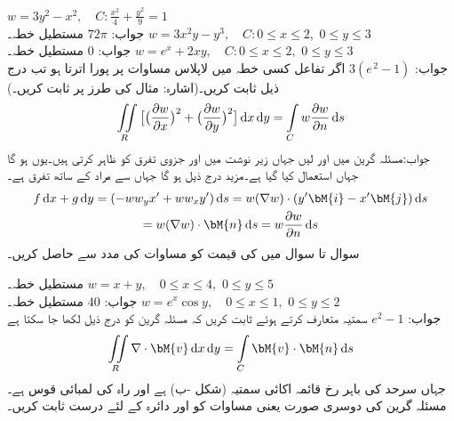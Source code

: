  \quad
$w=3y^2-x^2,\quad C:\tfrac{x^2}{4}+\tfrac{y^2}{9}=1$\\
جواب:\quad
$72\pi$
 \quad مستطیل خطہ۔\quad
$w=3x^2y-y^3,\quad C:0\le x\le 2,\,\, 0\le y\le 3$\\
جواب:\quad
$0$
 \quad مستطیل خطہ۔\quad
$w=e^x+2xy,\quad C:0\le x\le 2,\,\, 0\le y\le 3$\\
جواب:\quad
$3(e^{\,2}-1)$
\quad اگر تفاعل  کسی خطہ  میں لاپلاس مساوات  پر پورا اترتا ہو تب درج ذیل ثابت کریں۔(اشارہ: مثال  کی طرز پر ثابت کریں۔) 
\begin{align}\label{مساوات_خطی_تکمل_لاپلاسی_تعلق_ب}
\iint\limits_R \big[\big(\frac{\partial w}{\partial x}\big)^2+\big(\frac{\partial w}{\partial y}\big)^2\big]\dif x\dif y=\int\limits_C w\frac{\partial w}{\partial n}\dif s
\end{align}
جواب:مسئلہ گرین میں  اور  لیں جہاں زیر نوشت میں  اور  جزوی تفرق کو ظاہر کرتی ہیں۔یوں 
 ہو گا جہاں  استعمال کیا گیا ہے۔مزید درج ذیل ہو گا جہاں  سے مراد  کے ساتھ تفرق ہے۔
\begin{multline*}
f\dif x+g\dif y=(-ww_yx'+ww_xy')\dif s=w(\nabla w)\cdot (y'\bM{i}-x'\bM{j})\dif s\\
=w(\nabla w)\cdot \bM{n}\dif s=w\frac{\partial w}{\partial n}\dif s
\end{multline*}
سوال  تا سوال  میں  کی قیمت کو مساوات  کی مدد سے حاصل کریں۔

\quad مستطیل خطہ۔
$w=x+y,\quad 0\le x\le 4,\,\, 0 \le y \le 5$\\
جواب:\quad
$40$
\quad مستطیل خطہ۔
$w=e^x\cos y,\quad 0\le x\le 1,\,\, 0 \le y \le 2$\\
جواب:\quad
$e^2-1$
\quad
سمتیہ  متعارف کرتے ہوئے ثابت کریں کہ مسئلہ گرین  کو درج ذیل لکھا جا سکتا ہے
\begin{align}\label{مساوات_خطی_تکمل_مسئلہ_گرین_دوسری_صورت}
\iint\limits_R \nabla \cdot \bM{v}\dif x\dif y=\int\limits_C \bM{v}\cdot \bM{n}\dif s
\end{align}
جہاں  سرحد کی باہر رخ قائمہ اکائی سمتیہ (شکل -ب) ہے اور  راہ  کی لمبائی قوس ہے۔ 
مسئلہ گرین کی دوسری صورت یعنی مساوات  کو  اور دائرہ  کے لئے درست ثابت کریں۔

